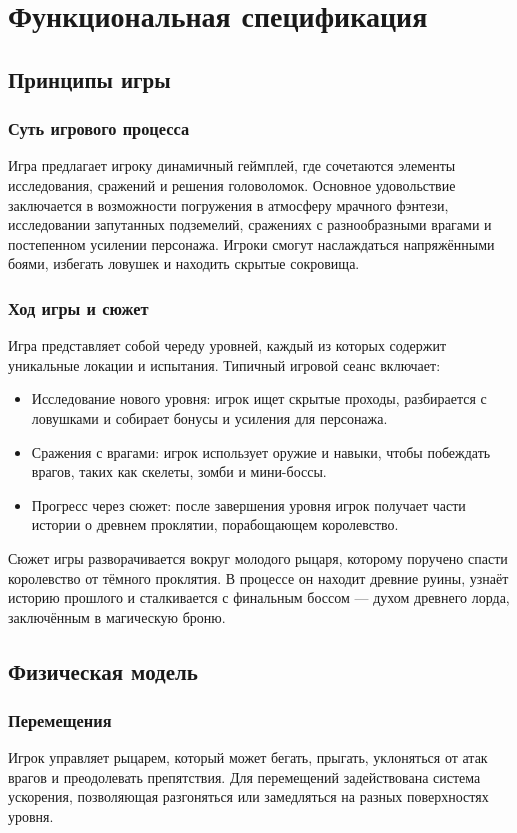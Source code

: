 \documentclass{article}
\begin{document}
\section{Функциональная спецификация}

\subsection{Принципы игры}
\subsubsection{Суть игрового процесса}
Игра предлагает игроку динамичный геймплей, где сочетаются элементы исследования, сражений и решения головоломок. Основное удовольствие заключается в возможности погружения в атмосферу мрачного фэнтези, исследовании запутанных подземелий, сражениях с разнообразными врагами и постепенном усилении персонажа. Игроки смогут наслаждаться напряжёнными боями, избегать ловушек и находить скрытые сокровища.
\subsubsection{Ход игры и сюжет}
Игра представляет собой череду уровней, каждый из которых содержит уникальные локации и испытания. Типичный игровой сеанс включает:
\begin{itemize}
    \item Исследование нового уровня: игрок ищет скрытые проходы, разбирается с ловушками и собирает бонусы и усиления для персонажа.
    \item Сражения с врагами: игрок использует оружие и навыки, чтобы побеждать врагов, таких как скелеты, зомби и мини-боссы.
    \item Прогресс через сюжет: после завершения уровня игрок получает части истории о древнем проклятии, порабощающем королевство.
\end{itemize}
Сюжет игры разворачивается вокруг молодого рыцаря, которому поручено спасти королевство от тёмного проклятия. В процессе он находит древние руины, узнаёт историю прошлого и сталкивается с финальным боссом — духом древнего лорда, заключённым в магическую броню.

\subsection{Физическая модель}

\subsubsection{Перемещения}
Игрок управляет рыцарем, который может бегать, прыгать, уклоняться от атак врагов и преодолевать препятствия. Для перемещений задействована система ускорения, позволяющая разгоняться или замедляться на разных поверхностях уровня.
\end{document}
